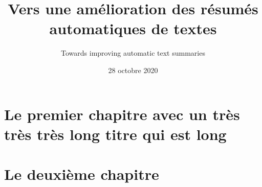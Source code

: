 \documentclass{esithesis}
\date{28 octobre 2020}
\title{Vers une amélioration des résumés automatiques de textes}
\subtitle{Towards improving automatic text summaries}
\begin{document}
\maketitle

\mainmatter

\chapter{Le premier chapitre avec un très très très long titre qui est long}

\lipsum[2-4]

\lipsum[2-4]

\chapter{Le deuxième chapitre}

\lipsum[2-4]

\lipsum[2-4]
\end{document}
